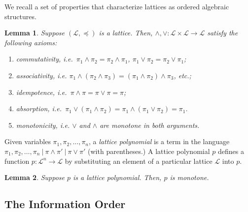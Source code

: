\documentclass[conference]{ieeeconf}
\renewcommand{\L}{\mathcal{L}}
\newcommand{\join}{\vee}
\newcommand{\meet}{\wedge}
\DeclareMathOperator{\Atoms}{At}
\newtheorem{lemma}{Lemma}
\begin{document}
We recall a set of properties that characterize lattices as ordered algebraic structures.

\begin{lemma} \label{lem:lattice-axiom} 
    Suppose $(\L,\preceq)$ is a lattice. Then, $\meet, \join: \L \times \L \to \L$ satisfy the following axioms:
    \begin{enumerate}
        \item \emph{commutativity}, i.e.~$\pi_1 \meet \pi_2 = \pi_2 \meet \pi_1$, $\pi_1 \join \pi_2 = \pi_2 \join \pi_1$;
        \item \emph{associativity}, i.e. {\small $\pi_1 \meet (\pi_2 \meet \pi_3) = (\pi_1 \meet \pi_2) \meet \pi_3$}, etc.;
        \item \emph{idempotence}, i.e.~$\pi \meet \pi = \pi \join \pi =  \pi$;
        \item \emph{absorption}, i.e.~$\pi_1 \join \left( \pi_1 \meet \pi_2 \right) = \pi_1 \meet \left( \pi_1 \join \pi_2 \right) = \pi_1$.
        \item \emph{monotonicity}, i.e. $\join$ and $\meet$ are monotone in both arguments.
    \end{enumerate}
\end{lemma}

Given variables $\pi_1,\pi_2,\dots,\pi_n$, a \emph{lattice polynomial} is a term in the language $\pi_1,\pi_2,\dots,\pi_n~\vert~\pi \meet \pi'~\vert~\pi \join \pi'$ (with parentheses.) A lattice polynomial $p$ defines a function $p: \L^n \to \L$ by substituting an element of a particular lattice $\L$ into $p$.

\begin{lemma}\label{lem:lattice-poly}
    Suppose $p$ is a lattice polynomial. Then, $p$ is monotone.
\end{lemma}



\subsection{The Information Order}
\end{document}
